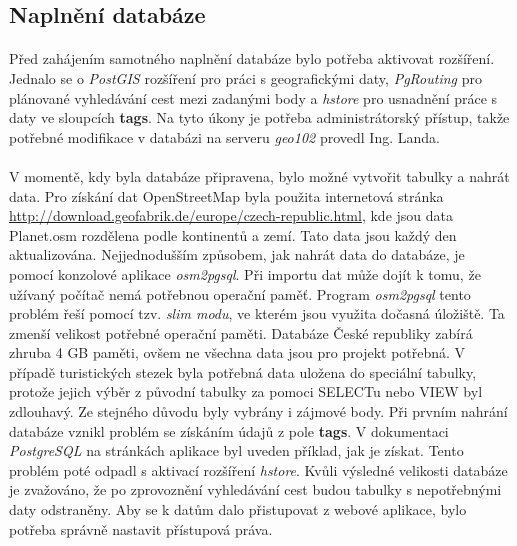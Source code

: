 \documentclass[11pt,a4paper,titlepage,oneside]{book}
\begin{document}
			\subsection{Naplnění databáze}
				\paragraph{} Před zahájením samotného naplnění databáze bylo potřeba aktivovat rozšíření. Jednalo se o \textit{PostGIS} rozšíření pro práci s geografickými daty, \textit{PgRouting} pro plánované vyhledávání cest mezi zadanými body a \textit{hstore} pro usnadnění práce s daty ve sloupcích \textbf{tags}. Na tyto úkony je potřeba administrátorský přístup, takže potřebné modifikace v databázi na serveru \textit{geo102} provedl Ing. Landa.
				\paragraph{} V momentě, kdy byla databáze připravena, bylo možné vytvořit tabulky a nahrát data. Pro získání dat OpenStreetMap byla použita internetová stránka \url{http://download.geofabrik.de/europe/czech-republic.html}, kde jsou data Planet.osm rozdělena podle kontinentů a zemí. Tato data jsou každý den aktualizována. Nejjednodušším způsobem, jak nahrát data do databáze, je pomocí konzolové aplikace \textit{osm2pgsql}. Při importu dat může dojít k tomu, že užívaný počítač nemá potřebnou operační paměť. Program \textit{osm2pgsql} tento problém řeší pomocí tzv. \textit{slim modu}, ve kterém jsou využita dočasná úložiště. Ta zmenší velikost potřebné operační paměti. Databáze České republiky zabírá zhruba 4 GB paměti, ovšem ne všechna data jsou pro projekt potřebná. V případě turistických stezek byla potřebná data uložena do speciální tabulky, protože jejich výběr z původní tabulky za pomoci SELECTu nebo VIEW byl zdlouhavý. Ze stejného důvodu byly vybrány i zájmové body. Při prvním nahrání databáze vznikl problém se získáním údajů z pole \textbf{tags}. V dokumentaci \textit{PostgreSQL} na stránkách aplikace byl uveden příklad, jak je získat. Tento problém poté odpadl s aktivací rozšíření \textit{hstore}. Kvůli výsledné velikosti databáze je zvažováno, že po zprovoznění vyhledávání cest budou tabulky s nepotřebnými daty odstraněny. Aby se k datům dalo přistupovat z webové aplikace, bylo potřeba správně nastavit přístupová práva.
\end{document}
